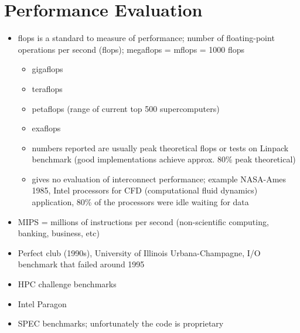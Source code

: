 \documentclass[10pt]{article}
\newenvironment{mitemize}
{
  \begin{itemize}
  \setlength{\itemsep}{1pt}
  \setlength{\parskip}{0pt}
  \setlength{\parsep}{0pt}}{\end{itemize}
}
\begin{document}
\section{Performance Evaluation}
\begin{mitemize}
  \item flops is a standard to measure of performance; number of floating-point operations per second (flops); megaflops = mflops = 1000 flops
  \begin{mitemize}
    \item gigaflops
    \item teraflops
    \item petaflops (range of current top 500 supercomputers)
    \item exaflops
    \item numbers reported are usually peak theoretical flops or tests on Linpack benchmark (good implementations achieve approx. 80\% peak theoretical)
    \item gives no evaluation of interconnect performance; example NASA-Ames 1985, Intel processors for CFD (computational fluid dynamics) application, 80\% of the processors were idle waiting for data
  \end{mitemize}
  \item MIPS = millions of instructions per second (non-scientific computing, banking, business, etc)
  \item Perfect club (1990s), University of Illinois Urbana-Champagne, I/O benchmark that failed around 1995
  \item HPC challenge benchmarks
  \item Intel Paragon
  \item SPEC benchmarks; unfortunately the code is proprietary
\end{mitemize}
\end{document}
